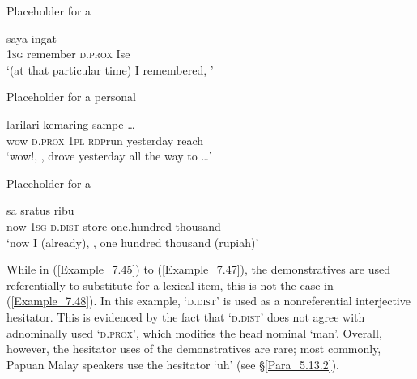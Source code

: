 {\begin{styleExampleTitle}
Placeholder for a 
\end{styleExampleTitle}

\ea
\label{Example_7.45}
\gll {\ldots} {saya} {ingat} {} {}\\ %
   { }  \textsc{1sg}  remember  \textsc{d.prox}  Ise\\
\glt 
‘(at that particular time) I remembered, ’ \textstyleExampleSource{[080917-008-NP.0102]}
\z

\begin{styleExampleTitle}
Placeholder for a personal 
\end{styleExampleTitle}

\ea
\label{Example_7.46}
 {} {} \textup{\textbar} {} {} {lari{\Tilde}lari} {kemaring} {sampe} {\ldots}\\ %
 wow  \textsc{d.prox} {}  {}  {}  \textsc{1pl}  \textsc{rdp}{\Tilde}run  yesterday  reach  \\
\glt 
‘wow!, ,  drove yesterday all the way to \ldots’ \textstyleExampleSource{[081006-033-Cv.0007]}
\z

\begin{styleExampleTitle}
Placeholder for a 
\end{styleExampleTitle}

\ea
\label{Example_7.47}
 {sa} {} {} \textup{\textbar} {} {} {sratus} {ribu}\\ %
 now  \textsc{1sg}  \textsc{d.dist} {} {} {}  store  one.hundred  thousand\\
\glt 
‘now I (already), ,  one hundred thousand (rupiah)’ \textstyleExampleSource{[081110-002-Cv.0039]}
\z



While in (\ref{Example_7.45}) to (\ref{Example_7.47}), the demonstratives are used referentially to substitute for a lexical item, this is not the case in (\ref{Example_7.48}). In this example,  ‘\textsc{d.dist}’ is used as a nonreferential interjective hesitator. This is evidenced by the fact that  ‘\textsc{d.dist}’ does not agree with adnominally used  ‘\textsc{d.prox}’, which modifies the head nominal  ‘man’. Overall, however, the hesitator uses of the demonstratives are rare; most commonly, Papuan Malay speakers use the hesitator  ‘uh’ (see §\ref{Para_5.13.2}).



}
